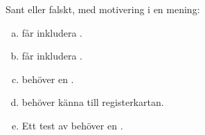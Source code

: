 \label{ex:4:5}
Sant eller falskt, med motivering i en mening:
\begin{enumerate}[a)]
  \item {} får inkludera .
  \item {} får inkludera .
  \item {} behöver en .
  \item {} behöver känna till registerkartan.
  \item Ett test av  behöver en .
\end{enumerate}
